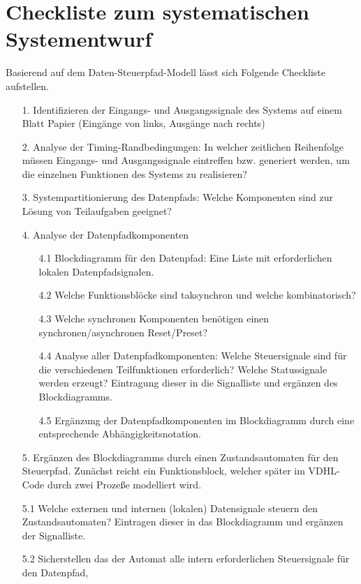 \documentclass{article}
\begin{document}
\section{Checkliste zum systematischen Systementwurf}
Basierend auf dem Daten-Steuerpfad-Modell lässt sich Folgende Checkliste aufstellen.
\begin{itemize}
	\item[1.] 	Identifizieren der Eingangs- und Ausgangssignale des Systems auf einem Blatt Papier
  				(Eingänge von links, Ausgänge nach rechts)
	\item[2.]	Analyse der Timing-Randbedingungen:
  				In welcher zeitlichen Reihenfolge müssen Eingangs- und Ausgangssignale eintreffen bzw. 
  				generiert werden, um die einzelnen Funktionen des Systems zu realisieren?
	\item[3.] 	Systempartitionierung des Datenpfads:
  				Welche Komponenten sind zur Lösung von Teilaufgaben geeignet?
	\item[4.] 	Analyse der Datenpfadkomponenten
  		\begin{itemize}
  			\item[4.1]	Blockdiagramm für den Datenpfad:
						Eine Liste mit erforderlichen lokalen Datenpfadsignalen.
			\item[4.2]	Welche Funktionsblöcke sind taksynchron und welche kombinatorisch?
			\item[4.3] 	Welche synchronen Komponenten benötigen einen synchronen/asynchronen Reset/Preset?
			\item[4.4] 	Analyse aller Datenpfadkomponenten:
						Welche Steuersignale sind für die verschiedenen Teilfunktionen erforderlich?
						Welche Statussignale werden erzeugt?
						Eintragung dieser in die Signalliste und ergänzen des Blockdiagramms.
			\item[4.5]	Ergänzung der Datenpfadkomponenten im Blockdiagramm durch eine entsprechende
						Abhängigkeitsnotation. 
  		\end{itemize}
	\item[5.]	Ergänzen des Blockdiagramms durch einen Zustandsautomaten für den Steuerpfad. Zunächst
				reicht ein Funktionsblock, welcher später im VDHL-Code durch zwei Prozeße modelliert wird.
	\item[5.1]	Welche externen und internen (lokalen) Datensignale steuern den Zustandsautomaten?
			 	Eintragen dieser in das Blockdiagramm und ergänzen der Signalliste.
	\item[5.2]	Sicherstellen das der Automat alle intern erforderlichen Steuersignale für den Datenpfad,

\end{itemize}
\end{document}
